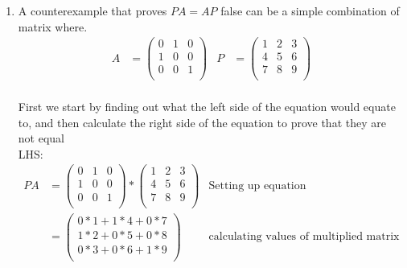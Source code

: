 \documentclass[11pt]{article}
\begin{document}
\begin{enumerate}
\begin{enumerate}
    \item A counterexample that proves $PA = AP$ false can be a simple combination of matrix where.
    \begin{align*}
        A &=
        \begin{pmatrix}
        0 & 1 & 0 \\ 
        1 & 0 & 0 \\
        0 & 0 & 1 \\ 
        \end{pmatrix}
        & 
        P &= 
        \begin{pmatrix}
            1 & 2 & 3 \\
            4 & 5 & 6 \\
            7 & 8 & 9 \\
        \end{pmatrix}
    \end{align*}\\
    First we start by finding out what the left side of the equation would equate to, and then calculate the right side of the equation to prove that they are not equal\\
    LHS:\\
    \begin{align*}
        PA &= 
        \begin{pmatrix}
        0 & 1 & 0 \\ 
        1 & 0 & 0 \\
        0 & 0 & 1 \\ 
        \end{pmatrix}
        * 
        \begin{pmatrix}
            1 & 2 & 3 \\
            4 & 5 & 6 \\
            7 & 8 & 9 \\
        \end{pmatrix}
        & \text{Setting up equation}\\
        &= 
        \begin{pmatrix}
            0*1 + 1*4 + 0*7 \\ 
            1*2 + 0*5 + 0*8 \\
            0*3 + 0*6 + 1*9 \\ 
        \end{pmatrix}
        & \text{calculating values of multiplied matrix}
    \end{align*}
\end{enumerate}

\end{enumerate}
\end{document}
